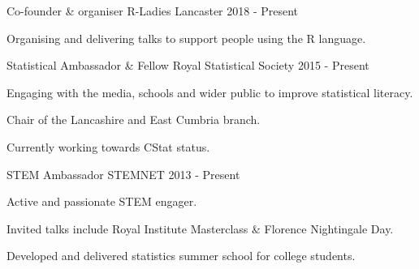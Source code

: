 \begin{cventries}

  \cventry
    {Co-founder \& organiser}
    {R-Ladies Lancaster}
    {}
    {2018 - Present}
    {
      \begin{cvitems}
        \item {Organising and delivering talks to support people using the R language.}
      \end{cvitems}
    }
  \cventry
    {Statistical Ambassador \& Fellow}
    {Royal Statistical Society}
    {}
    {2015 - Present}
    {
      \begin{cvitems}
        \item {Engaging with the media, schools and wider public to improve statistical literacy.}
        \item {Chair of the Lancashire and East Cumbria branch.}
        \item {Currently working towards CStat status.}
      \end{cvitems}
    }
    \cventry
    {STEM Ambassador}
    {STEMNET}
    {}
    {2013 - Present}
    {
      \begin{cvitems}
        \item {Active and passionate STEM engager.}
        \item{Invited talks include Royal Institute Masterclass \& Florence Nightingale Day.}
        \item{Developed and delivered statistics summer school for college students.}
      \end{cvitems}
    }
\end{cventries}
